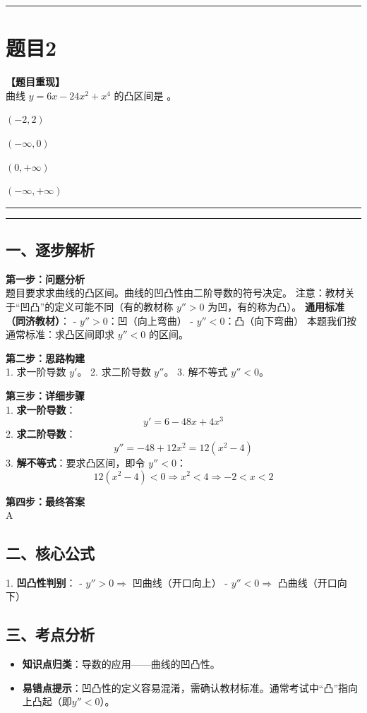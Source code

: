 \documentclass[12pt, a4paper]{ctexart}
\newcommand{\TopSeparator}{
    \par\noindent\rule{\textwidth}{1.5pt}\vspace{0.5em} %
}
\newcommand{\AnalysisSeparator}{
    \par\noindent\rule{\textwidth}{0.5pt}\vspace{0.2em}\hrule\vspace{0.5em} %
}
\newenvironment{RedAnalysis}{
    \par
    \color{red} %
}{
    \par
    \color{black} %
}
\newcommand{\choicesFour}[4]{
    \begin{enumerate}[label=\Alph*., itemsep=0pt, parsep=0pt, topsep=5pt, labelsep=0.5em]
        \begin{minipage}{0.22\linewidth} \item #1 \end{minipage}
        \begin{minipage}{0.22\linewidth} \item #2 \end{minipage}
        \begin{minipage}{0.22\linewidth} \item #3 \end{minipage}
        \begin{minipage}{0.22\linewidth} \item #4 \end{minipage}
    \end{enumerate}
}
\begin{document}
\TopSeparator
\section*{题目2}

\textbf{【题目重现】} \\
曲线 $ y=6x-24x^{2}+x^{4} $ 的凸区间是 \underline{\hspace{1cm}}。
\choicesFour{$ (-2,2) $}{$ (-\infty,0) $}{$ (0,+\infty) $}{$ (-\infty,+\infty) $}

\AnalysisSeparator

\begin{RedAnalysis}

\subsection*{一、逐步解析}

\textbf{第一步：问题分析} \\
题目要求求曲线的凸区间。曲线的凹凸性由二阶导数的符号决定。
注意：教材关于“凹凸”的定义可能不同（有的教材称 $y'' > 0$ 为凹，有的称为凸）。
\textbf{通用标准（同济教材）}：
- $y'' > 0$：凹（向上弯曲）
- $y'' < 0$：凸（向下弯曲）
本题我们按通常标准：求凸区间即求 $y'' < 0$ 的区间。

\textbf{第二步：思路构建} \\
1. 求一阶导数 $y'$。
2. 求二阶导数 $y''$。
3. 解不等式 $y'' < 0$。

\textbf{第三步：详细步骤} \\
1. \textbf{求一阶导数}：
   \[ y' = 6 - 48x + 4x^3 \]
2. \textbf{求二阶导数}：
   \[ y'' = -48 + 12x^2 = 12(x^2 - 4) \]
3. \textbf{解不等式}：要求凸区间，即令 $y'' < 0$：
   \[ 12(x^2 - 4) < 0 \Rightarrow x^2 < 4 \Rightarrow -2 < x < 2 \]

\textbf{第四步：最终答案} \\
A

\subsection*{二、核心公式}
1. \textbf{凹凸性判别}：
   - $y'' > 0 \Rightarrow$ 凹曲线（开口向上）
   - $y'' < 0 \Rightarrow$ 凸曲线（开口向下）

\subsection*{三、考点分析}
\begin{itemize}
    \item \textbf{知识点归类}：导数的应用——曲线的凹凸性。
    \item \textbf{易错点提示}：凹凸性的定义容易混淆，需确认教材标准。通常考试中“凸”指向上凸起（即$y'' < 0$）。
\end{itemize}

\end{RedAnalysis}
\end{document}
